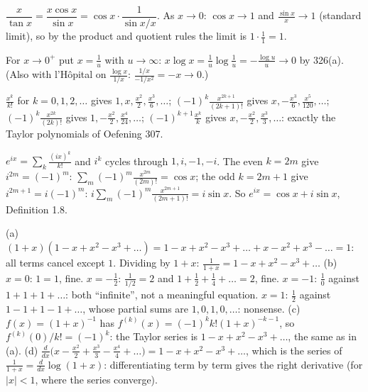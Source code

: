  $\dfrac x{\tan x}=\dfrac{x\cos x}{\sin x}=\cos x\cdot\dfrac1{\sin x/x}$. As $x\to0$: $\cos x\to1$ and $\frac{\sin x}x\to1$ (standard limit), so by the product and quotient rules the limit is $1\cdot\frac11=1$.

 For $x\to0^+$ put $x=\frac1u$ with $u\to\infty$: $x\log x=\frac1u\log\frac1u=-\frac{\log u}u\to0$ by 326(a). (Also with l'H\^opital on $\frac{\log x}{1/x}$: $\frac{1/x}{-1/x^2}=-x\to0$.)

 $\frac{x^k}{k!}$ for $k=0,1,2,\dots$ gives $1,x,\frac{x^2}2,\frac{x^3}6,\dots$; $(-1)^k\frac{x^{2k+1}}{(2k+1)!}$ gives $x,-\frac{x^3}{6},\frac{x^5}{120},\dots$; $(-1)^k\frac{x^{2k}}{(2k)!}$ gives $1,-\frac{x^2}2,\frac{x^4}{24},\dots$; $(-1)^{k+1}\frac{x^k}k$ gives $x,-\frac{x^2}2,\frac{x^3}3,\dots$: exactly the Taylor polynomials of Oefening 307.

 $e^{ix}=\sum_k\frac{(ix)^k}{k!}$ and $i^k$ cycles through $1,i,-1,-i$. The even $k=2m$ give $i^{2m}=(-1)^m$: $\sum_m(-1)^m\frac{x^{2m}}{(2m)!}=\cos x$; the odd $k=2m+1$ give $i^{2m+1}=i(-1)^m$: $i\sum_m(-1)^m\frac{x^{2m+1}}{(2m+1)!}=i\sin x$. So $e^{ix}=\cos x+i\sin x$, Definition 1.8.

 (a) $(1+x)(1-x+x^2-x^3+\dots)=1-x+x^2-x^3+\dots+x-x^2+x^3-\dots=1$: all terms cancel except $1$. Dividing by $1+x$: $\frac1{1+x}=1-x+x^2-x^3+\dots$ (b) $x=0$: $1=1$, fine. $x=-\frac12$: $\frac1{1/2}=2$ and $1+\frac12+\frac14+\dots=2$, fine. $x=-1$: $\frac10$ against $1+1+1+\dots$: both ``infinite'', not a meaningful equation. $x=1$: $\frac12$ against $1-1+1-1+\dots$, whose partial sums are $1,0,1,0,\dots$: nonsense. (c) $f(x)=(1+x)^{-1}$ has $f^{(k)}(x)=(-1)^kk!(1+x)^{-k-1}$, so $f^{(k)}(0)/k!=(-1)^k$: the Taylor series is $1-x+x^2-x^3+\dots$, the same as in (a). (d) $\frac d{dx}\big(x-\frac{x^2}2+\frac{x^3}3-\frac{x^4}4+\dots\big)=1-x+x^2-x^3+\dots$, which is the series of $\frac1{1+x}=\frac d{dx}\log(1+x)$: differentiating term by term gives the right derivative (for $|x|<1$, where the series converge).
